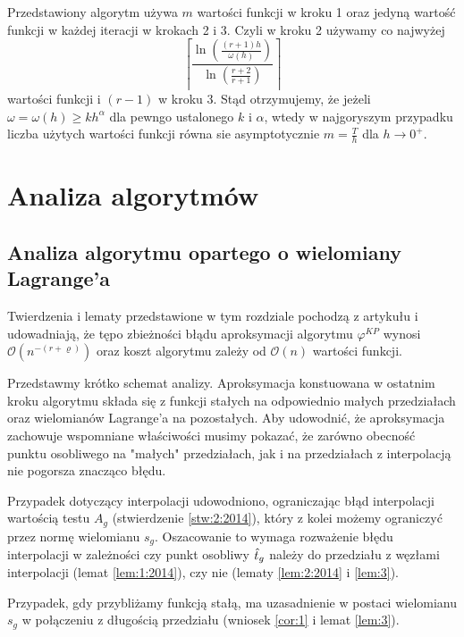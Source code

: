 \documentclass[oik, pdftex, robocza, man]{mgrwms}
\begin{document}
    Przedstawiony algorytm używa $m$ wartości funkcji w kroku 1 oraz jedyną wartość funkcji w każdej iteracji w krokach 2 i 3. Czyli w kroku 2 używamy co najwyżej
    \begin{equation*}
        \left\lceil\frac{\ln \left(\frac{(r+1) h}{\omega(h)}\right)}{\ln \left(\frac{r+2}{r+1}\right)}\right\rceil
    \end{equation*}
    wartości funkcji i $(r-1)$ w kroku 3.
    Stąd otrzymujemy, że jeżeli $\omega = \omega(h) \geq kh^{\alpha}$ dla pewngo ustalonego $k$ i $\alpha$, wtedy w najgoryszym przypadku liczba użytych wartości funkcji równa sie asymptotycznie $m = \frac{T}{h}$ dla $h \rightarrow 0^{+}$.


\mgrclosechapter


\chapter{Analiza algorytmów} \label{rozdzial:analiza_alg}


\section{Analiza algorytmu opartego o wielomiany Lagrange'a}

    Twierdzenia i lematy przedstawione w tym rozdziale pochodzą z artykułu \cite{CoDF} i udowadniają, że tępo zbieżności błądu aproksymacji algorytmu $\varphi^{KP}$ wynosi $\mathcal{O}(n^{-(r+\varrho)})$ oraz koszt algorytmu zależy od $\mathcal{O}(n)$ wartości funkcji.

    Przedstawmy krótko schemat analizy. Aproksymacja konstuowana w ostatnim kroku algorytmu składa się z funkcji stałych na odpowiednio małych przedziałach oraz wielomianów Lagrange'a na pozostałych. Aby udowodnić, że aproksymacja zachowuje wspomniane właściwości musimy pokazać, że zarówno obecność punktu osobliwego na "małych" przedziałach, jak i na przedziałach z interpolacją nie pogorsza znacząco błędu.

    Przypadek dotyczący interpolacji udowodniono, ograniczając błąd interpolacji wartością testu $A_{g}$ (stwierdzenie \ref{stw:2:2014}), który z kolei możemy ograniczyć przez normę wielomianu $s_{g}$. Oszacowanie to wymaga rozważenie błędu interpolacji w zależności czy punkt osobliwy $\hat{t}_{g}$ należy do przedziału z węzłami interpolacji (lemat \ref{lem:1:2014}), czy nie (lematy \ref{lem:2:2014} i \ref{lem:3}).
    
    Przypadek, gdy przybliżamy funkcją stałą, ma uzasadnienie w postaci wielomianu $s_{g}$ w połączeniu z długością przedziału (wniosek \ref{cor:1} i lemat \ref{lem:3}).
\end{document}
